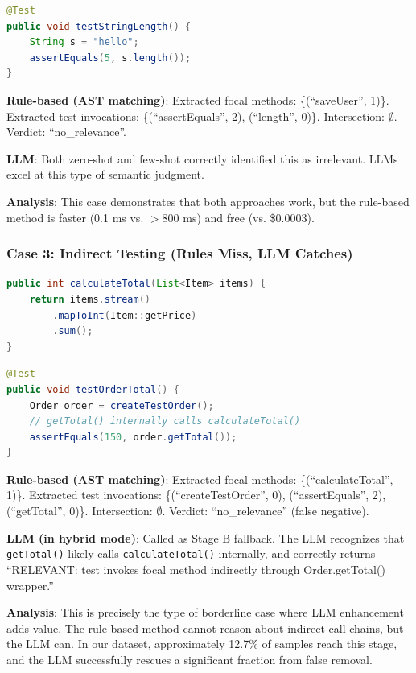 \documentclass[acmlarge,nonacm,screen]{acmart}
\begin{document}
\begin{lstlisting}[language=Java,caption={Case 2: Paired test (irrelevant)}]
@Test
public void testStringLength() {
    String s = "hello";
    assertEquals(5, s.length());
}
\end{lstlisting}

\textbf{Rule-based (AST matching)}: Extracted focal methods: \{(``saveUser'', 1)\}. Extracted test invocations: \{(``assertEquals'', 2), (``length'', 0)\}. Intersection: $\emptyset$. Verdict: ``no\_relevance''.

\textbf{LLM}: Both zero-shot and few-shot correctly identified this as irrelevant. LLMs excel at this type of semantic judgment.

\textbf{Analysis}: This case demonstrates that both approaches work, but the rule-based method is faster (0.1 ms vs. $>$800 ms) and free (vs. \$0.0003).

\subsubsection{Case 3: Indirect Testing (Rules Miss, LLM Catches)}

\begin{lstlisting}[language=Java,caption={Case 3: Focal method}]
public int calculateTotal(List<Item> items) {
    return items.stream()
        .mapToInt(Item::getPrice)
        .sum();
}
\end{lstlisting}

\begin{lstlisting}[language=Java,caption={Case 3: Test via wrapper}]
@Test
public void testOrderTotal() {
    Order order = createTestOrder();
    // getTotal() internally calls calculateTotal()
    assertEquals(150, order.getTotal());
}
\end{lstlisting}

\textbf{Rule-based (AST matching)}: Extracted focal methods: \{(``calculateTotal'', 1)\}. Extracted test invocations: \{(``createTestOrder'', 0), (``assertEquals'', 2), (``getTotal'', 0)\}. Intersection: $\emptyset$. Verdict: ``no\_relevance'' (false negative).

\textbf{LLM (in hybrid mode)}: Called as Stage B fallback. The LLM recognizes that \texttt{getTotal()} likely calls \texttt{calculateTotal()} internally, and correctly returns ``RELEVANT: test invokes focal method indirectly through Order.getTotal() wrapper.''

\textbf{Analysis}: This is precisely the type of borderline case where LLM enhancement adds value. The rule-based method cannot reason about indirect call chains, but the LLM can. In our dataset, approximately 12.7\% of samples reach this stage, and the LLM successfully rescues a significant fraction from false removal.
\end{document}
